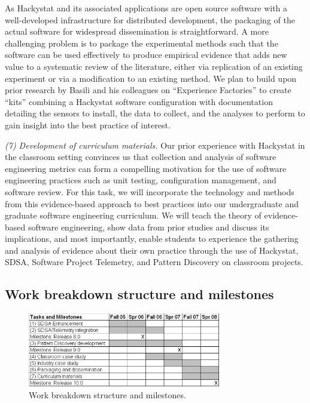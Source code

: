 As Hackystat and its associated applications are open source software with
a well-developed infrastructure for distributed development, the packaging
of the actual software for widespread dissemination is straightforward.  A
more challenging problem is to package the experimental methods such that
the software can be used effectively to produce empirical evidence that
adds new value to a systematic review of the literature, either via
replication of an existing experiment or via a modification to an existing
method.  We plan to build upon prior research by Basili and his colleagues
on ``Experience Factories'' \cite{Basili94} to create ``kits'' combining a
Hackystat software configuration with documentation detailing the sensors
to install, the data to collect, and the analyses to perform to gain
insight into the best practice of interest.

{\em (7) Development of curriculum materials.}  Our prior experience with
Hackystat in the classroom setting convinces us that collection and
analysis of software engineering metrics can form a compelling motivation
for the use of software engineering practices such as unit testing,
configuration management, and software review.  For this task, we will
incorporate the technology and methods from this evidence-based approach to
best practices into our undergraduate and graduate software engineering
curriculum.  We will teach the theory of evidence-based software
engineering, show data from prior studies and discuss its implications, and
most importantly, enable students to experience the gathering and analysis
of evidence about their own practice through the use of Hackystat, SDSA,
Software Project Telemetry, and Pattern Discovery on classroom projects.

\subsection{Work breakdown structure and milestones}

\begin{figure}[ht]
  \centering
  \includegraphics[width=0.75\textwidth]{workstructure.eps}
  \caption{Work breakdown structure and milestones.} 
  \label{fig:wbs}
\end{figure}


